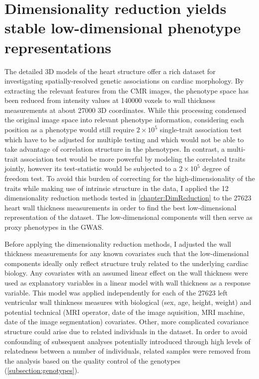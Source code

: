 \newpage
\section{Dimensionality reduction yields stable low-dimensional phenotype representations}
\label{section:DimRed-heart}
The detailed 3D models of the heart structure offer a rich dataset for investigating spatially-resolved genetic associations on cardiac morphology. By extracting the relevant features from the CMR images, the phenotype space has been reduced from intensity values at \num{140000} voxels to wall thickness measurements at about \num{27000} 3D coordinates. While this processing condensed the original image space into relevant phenotype information, considering each position as a phenotype would still require \(2\times 10^5\)  single-trait association test which have to be adjusted for multiple testing and which would not be able to take advantage of correlation structure in the phenotypes. In contrast, a multi-trait association test would be more powerful by modeling the correlated traits jointly, however its test-statistic would be subjected to a \(2 \times 10^5\)  degree of freedom test. To avoid this burden of correcting for the high-dimensionality of the traits while making use of intrinsic structure in the data, I applied the \num{12} dimensionality reduction methods tested in \cref{chapter:DimReduction} to the \num{27623} heart wall thickness measurements in order to find the best low-dimensional representation of the dataset. The low-dimensional components will then serve as proxy phenotypes in the GWAS.

Before applying the dimensionality reduction methods, I adjusted the wall thickness measurements for any known covariates such that the low-dimensional components ideally only reflect structure truly related to the underlying cardiac biology. Any covariates with an assumed linear effect on the wall thickness were used as explanatory variables in a linear model with wall thickness as a response variable. This model was applied independently for each of the \num{27623} left ventricular wall thinkness measures with biological (sex, age, height, weight) and potential technical (MRI operator, date of the image aquisition, MRI machine, date of the image segmentation) covariates. Other, more complicated covariance structure could arise due to related individuals in the dataset. In order to avoid confounding of subsequent analyses potentially introduced through high levels of relatedness between a number of individuals, related samples were removed from the analysis based on the quality control of the genotypes (\cref{subsection:genotypes}). 

